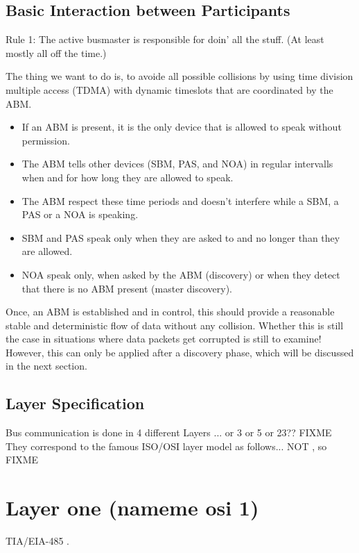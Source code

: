 \documentclass[a4paper,12pt]{scrartcl}
\begin{document}
\subsection{Basic Interaction between Participants}
Rule 1: The active busmaster is responsible for doin' all the stuff. (At least mostly all off the time.)

The thing we want to do is, to avoide all possible collisions by using time division multiple access
(TDMA) with dynamic timeslots that are coordinated by the ABM.

\begin{itemize}
\item If an ABM is present, it is the only device that is allowed to speak without permission.
\item The ABM tells other devices (SBM, PAS, and NOA) in regular intervalls when and for how long they are allowed to speak.
\item The ABM respect these time periods and doesn't interfere while a SBM, a PAS or a NOA is speaking.
\item SBM and PAS speak only when they are asked to and no longer than they are allowed.
\item NOA speak only, when asked by the ABM (discovery) or when they detect that there is no ABM present (master discovery).
\end{itemize}

Once, an ABM is established and in control, this should provide a reasonable stable and deterministic flow of data without any collision.
Whether this is still the case in situations where data packets get corrupted is still to examine!
However, this can only be applied after a discovery phase, which will be discussed in the next section.



\subsection{Layer Specification}
Bus communication is done in 4 different Layers ... or 3 or 5 or 23?? FIXME
They correspond to the famous ISO/OSI layer model as follows... NOT , so FIXME


\section{Layer one (nameme osi 1)}
TIA/EIA-485 \cite{EIA485}.
\end{document}
